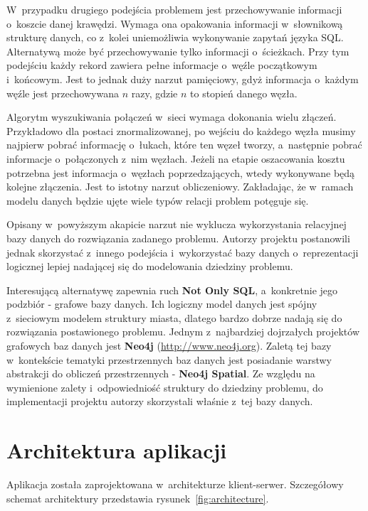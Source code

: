 \documentclass[a4paper,12pt]{article}
\begin{document}
	W~przypadku drugiego podejścia problemem jest przechowywanie informacji o~koszcie danej krawędzi. Wymaga ona opakowania informacji w~słownikową strukturę danych, co z~kolei uniemożliwia wykonywanie zapytań języka SQL. Alternatywą może być przechowywanie tylko informacji o~ścieżkach. Przy tym podejściu każdy rekord zawiera pełne informacje o~węźle początkowym i~końcowym. Jest to jednak duży narzut pamięciowy, gdyż informacja o~każdym węźle jest przechowywana $n$ razy, gdzie $n$ to stopień danego węzła.

	Algorytm wyszukiwania połączeń w~sieci wymaga dokonania wielu złączeń. Przykładowo dla postaci znormalizowanej, po wejściu do każdego węzła musimy najpierw pobrać informację o~łukach, które ten węzeł tworzy, a~następnie pobrać informacje o~połączonych z~nim węzłach. Jeżeli na etapie oszacowania kosztu potrzebna jest informacja o~węzłach poprzedzających, wtedy wykonywane będą kolejne złączenia. Jest to istotny narzut obliczeniowy. Zakładając, że w~ramach modelu danych będzie ujęte wiele typów relacji problem potęguje się.

	Opisany w~powyższym akapicie narzut nie wyklucza wykorzystania relacyjnej bazy danych do rozwiązania zadanego problemu. Autorzy projektu postanowili jednak skorzystać z~innego podejścia i~wykorzystać bazy danych o~reprezentacji logicznej lepiej nadającej się do modelowania dziedziny problemu.

	Interesującą alternatywę zapewnia ruch \textbf{Not Only SQL}, a~konkretnie jego podzbiór - grafowe bazy danych. Ich logiczny model danych jest spójny z~sieciowym modelem struktury miasta, dlatego bardzo dobrze nadają się do rozwiązania postawionego problemu. Jednym z~najbardziej dojrzałych projektów grafowych baz danych jest \textbf{Neo4j} (\url{http://www.neo4j.org}). Zaletą tej bazy w~kontekście tematyki przestrzennych baz danych jest posiadanie warstwy abstrakcji do obliczeń przestrzennych - \textbf{Neo4j Spatial}. Ze względu na wymienione zalety i~odpowiedniość struktury do dziedziny problemu, do implementacji projektu autorzy skorzystali właśnie z~tej bazy danych.

	\section*{Architektura aplikacji}

	Aplikacja została zaprojektowana w~architekturze klient-serwer. Szczegółowy schemat architektury przedstawia rysunek~\ref{fig:architecture}. 
\end{document}
